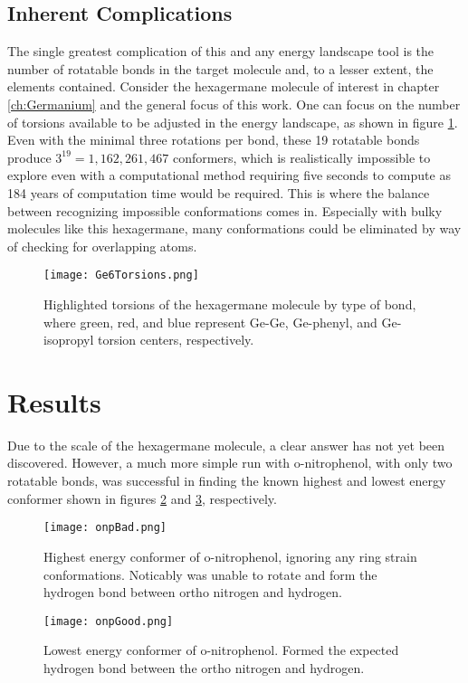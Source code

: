 \subsection{Inherent Complications}

The single greatest complication of this and any energy landscape tool is the number of rotatable bonds in the target molecule and, to a lesser extent, the elements contained.
Consider the hexagermane molecule of interest in chapter \ref{ch:Germanium} and the general focus of this work.
One can focus on the number of torsions available to be adjusted in the energy landscape, as shown in figure \ref{fig:Ge6Torsions}. 
Even with the minimal three rotations per bond, these 19 rotatable bonds produce $3^{19} = 1,162,261,467$ conformers, which is realistically impossible to explore even with a computational method requiring five seconds to compute as 184 years of computation time would be required.
This is where the balance between recognizing impossible conformations comes in.
Especially with bulky molecules like this hexagermane, many conformations could be eliminated by way of checking for overlapping atoms.

\begin{figure}
	\centering 
	\texttt{[image: Ge6Torsions.png]}
	\caption{Highlighted torsions of the hexagermane molecule by type of bond, where green, red, and blue represent Ge-Ge, Ge-phenyl, and Ge-isopropyl torsion centers, respectively.}
	\label{fig:Ge6Torsions}
\end{figure}


\section{Results}

Due to the scale of the hexagermane molecule, a clear answer has not yet been discovered.
However, a much more simple run with o-nitrophenol, with only two rotatable bonds, was successful in finding the known highest and lowest energy conformer shown in figures \ref{fig:onpBad} and \ref{fig:onpGood}, respectively.

\begin{figure}
	\centering 
	\texttt{[image: onpBad.png]}
	\caption{Highest energy conformer of o-nitrophenol, ignoring any ring strain conformations. Noticably was unable to rotate and form the hydrogen bond between ortho nitrogen and hydrogen.}
	\label{fig:onpBad}
\end{figure}
\begin{figure}
	\centering 
	\texttt{[image: onpGood.png]}
	\caption{Lowest energy conformer of o-nitrophenol. Formed the expected hydrogen bond between the ortho nitrogen and hydrogen.}
	\label{fig:onpGood}
\end{figure}

